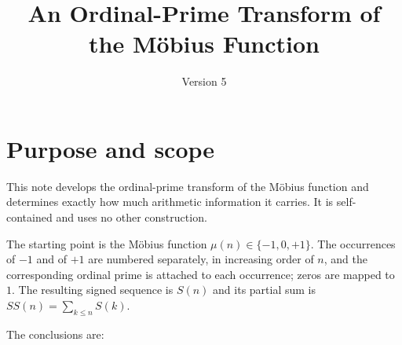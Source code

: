 \documentclass[11pt]{amsart}
\title{An Ordinal-Prime Transform of the M\"obius Function}
\author{}
\date{Version 5}
\numberwithin{equation}{section}
\theoremstyle{plain}
\theoremstyle{definition}
\theoremstyle{remark}
\newcommand{\mob}{\mu}
\begin{document}
\maketitle
\tableofcontents

\section{Purpose and scope}
\label{sec:purpose}

This note develops the ordinal-prime transform of the M\"obius function and
determines exactly how much arithmetic information it carries. It is
self-contained and uses no other construction.

The starting point is the M\"obius function $\mob(n)\in\{-1,0,+1\}$. The
occurrences of $-1$ and of $+1$ are numbered separately, in increasing order of
$n$, and the corresponding ordinal prime is attached to each occurrence; zeros
are mapped to $1$. The resulting signed sequence is $S(n)$ and its partial sum
is $SS(n)=\sum_{k\le n}S(k)$.

The conclusions are:
\end{document}
